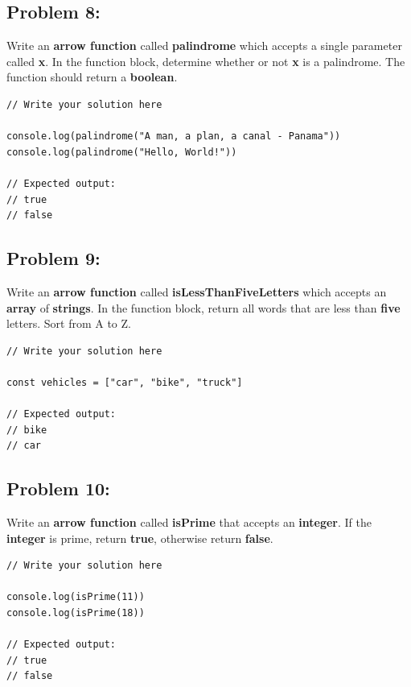 \documentclass{article}
\begin{document}
\subsection*{Problem 8:}
Write an \textbf{arrow function} called \textbf{palindrome} which accepts a single parameter called \textbf{x}. In the function block, determine whether or not \textbf{x} is a palindrome. The function should return a \textbf{boolean}.

\begin{verbatim}
// Write your solution here

console.log(palindrome("A man, a plan, a canal - Panama"))
console.log(palindrome("Hello, World!"))

// Expected output:
// true
// false
\end{verbatim}
 
\subsection*{Problem 9:}
Write an \textbf{arrow function} called \textbf{isLessThanFiveLetters} which accepts an \textbf{array} of \textbf{strings}. In the function block, return all words that are less than \textbf{five} letters. Sort from A to Z.

\begin{verbatim} 
// Write your solution here

const vehicles = ["car", "bike", "truck"]

// Expected output:
// bike
// car
\end{verbatim}

\subsection*{Problem 10:}
Write an \textbf{arrow function} called \textbf{isPrime} that accepts an \textbf{integer}. If the \textbf{integer} is prime, return \textbf{true}, otherwise return \textbf{false}. 

\begin{verbatim}
// Write your solution here

console.log(isPrime(11))
console.log(isPrime(18))

// Expected output: 
// true
// false
\end{verbatim}
\end{document}
